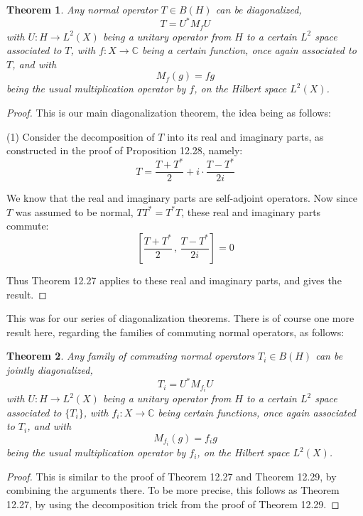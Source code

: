 \documentclass[12pt]{amsbook}
\newtheorem{theorem}{Theorem}[chapter]
\begin{document}

\begin{theorem}
Any normal operator $T\in B(H)$ can be diagonalized,
$$T=U^*M_fU$$
with $U:H\to L^2(X)$ being a unitary operator from $H$ to a certain $L^2$ space associated to $T$, with $f:X\to\mathbb C$ being a certain function, once again associated to $T$, and with
$$M_f(g)=fg$$
being the usual multiplication operator by $f$, on the Hilbert space $L^2(X)$.
\end{theorem}

\begin{proof}
This is our main diagonalization theorem, the idea being as follows:

\medskip

(1) Consider the decomposition of $T$ into its real and imaginary parts, as constructed in the proof of Proposition 12.28, namely:
$$T=\frac{T+T^*}{2}+i\cdot\frac{T-T^*}{2i}$$

We know that the real and imaginary parts are self-adjoint operators. Now since $T$ was assumed to be normal, $TT^*=T^*T$, these real and imaginary parts commute:
$$\left[\frac{T+T^*}{2}\,,\,\frac{T-T^*}{2i}\right]=0$$

Thus Theorem 12.27 applies to these real and imaginary parts, and gives the result.
\end{proof}

This was for our series of diagonalization theorems. There is of course one more result here, regarding the families of commuting normal operators, as follows:


\begin{theorem}
Any family of commuting normal operators $T_i\in B(H)$ can be jointly diagonalized,
$$T_i=U^*M_{f_i}U$$
with $U:H\to L^2(X)$ being a unitary operator from $H$ to a certain $L^2$ space associated to $\{T_i\}$, with $f_i:X\to\mathbb C$ being certain functions, once again associated to $T_i$, and with
$$M_{f_i}(g)=f_ig$$
being the usual multiplication operator by $f_i$, on the Hilbert space $L^2(X)$.
\end{theorem}

\begin{proof}
This is similar to the proof of Theorem 12.27 and Theorem 12.29, by combining the arguments there. To be more precise, this follows as Theorem 12.27, by using the decomposition trick from the proof of Theorem 12.29.
\end{proof}
\end{document}

